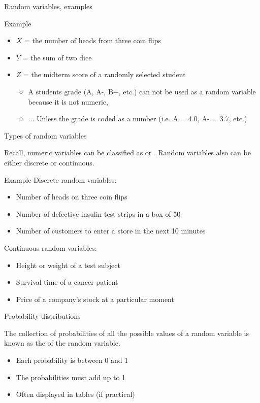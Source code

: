 \documentclass[xcolor=table, aspectratio=169, bigger]{beamer}
\begin{document}
\begin{frame}{Random variables, examples}
\begin{exampleblock}{Example}
\begin{itemize}
\item $X$ = the number of heads from three coin flips
\item $Y$ = the sum of two dice
\item $Z$ = the midterm score of a randomly selected student
\begin{itemize}
\item A students grade (A, A-, B+, etc.) can not be used as a random variable because it is not numeric,
\item ... Unless the grade is coded as a number (i.e. A = 4.0, A- = 3.7, etc.)
\end{itemize}
\end{itemize}
\end{exampleblock}
\end{frame}

\begin{frame}{Types of random variables}
\begin{block}{}
Recall, numeric variables can be classified as  or . Random variables also can be either discrete or continuous.
\end{block}

\pause
\begin{exampleblock}{Example}
Discrete random variables:
\begin{itemize}
\item Number of heads on three coin flips
\item Number of defective insulin test strips in a box of 50
\item Number of customers to enter a store in the next 10 minutes
\end{itemize}
\pause
Continuous random variables:
\begin{itemize}
\item Height or weight of a test subject
\item Survival time of a cancer patient
\item Price of a company's stock at a particular moment
\end{itemize}
\end{exampleblock}
\end{frame}

\begin{frame}{Probability distributions}
\begin{block}{}
The collection of probabilities of all the possible values of a random variable is known as the  of the random variable.

\begin{itemize}
\pause\item Each probability is between 0 and 1
\pause\item The probabilities must add up to 1
\pause\item Often displayed in tables (if practical)
\end{itemize}
\end{block}
\end{frame}
\end{document}
